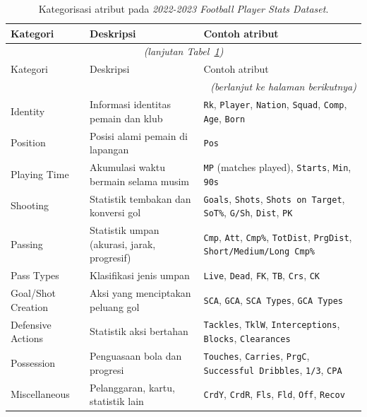 \begin{longtable}{@{}p{2.6cm} p{4.2cm} p{5.7cm}@{}}
  \caption{Kategorisasi atribut pada \emph{2022-2023 Football Player Stats Dataset}.}
  \label{tab:fbref-attr-categories} \\
  \toprule
  Kategori & Deskripsi & Contoh atribut \\
  \midrule
  \endfirsthead
  \multicolumn{3}{c}{\textit{(lanjutan Tabel~\ref{tab:fbref-attr-categories})}} \\
  \toprule
  Kategori & Deskripsi & Contoh atribut \\
  \midrule
  \endhead
  \midrule
  \multicolumn{3}{r}{\textit{(berlanjut ke halaman berikutnya)}} \\
  \endfoot
  \bottomrule
  \endlastfoot
  Identity              & Informasi identitas pemain dan klub                                & \texttt{Rk}, \texttt{Player}, \texttt{Nation}, \texttt{Squad}, \texttt{Comp}, \texttt{Age}, \texttt{Born} \\
  Position              & Posisi alami pemain di lapangan                                    & \texttt{Pos} \\
  Playing Time          & Akumulasi waktu bermain selama musim                               & \texttt{MP} (matches played), \texttt{Starts}, \texttt{Min}, \texttt{90s} \\
  Shooting              & Statistik tembakan dan konversi gol                                & \texttt{Goals}, \texttt{Shots}, \texttt{Shots on Target}, \texttt{SoT\%}, \texttt{G/Sh}, \texttt{Dist}, \texttt{PK} \\
  Passing               & Statistik umpan (akurasi, jarak, progresif)                        & \texttt{Cmp}, \texttt{Att}, \texttt{Cmp\%}, \texttt{TotDist}, \texttt{PrgDist}, \texttt{Short/Medium/Long Cmp\%} \\
  Pass Types            & Klasifikasi jenis umpan                                            & \texttt{Live}, \texttt{Dead}, \texttt{FK}, \texttt{TB}, \texttt{Crs}, \texttt{CK} \\
  Goal/Shot Creation    & Aksi yang menciptakan peluang gol                                  & \texttt{SCA}, \texttt{GCA}, \texttt{SCA Types}, \texttt{GCA Types} \\
  Defensive Actions     & Statistik aksi bertahan                                            & \texttt{Tackles}, \texttt{TklW}, \texttt{Interceptions}, \texttt{Blocks}, \texttt{Clearances} \\
  Possession            & Penguasaan bola dan progresi                                       & \texttt{Touches}, \texttt{Carries}, \texttt{PrgC}, \texttt{Successful Dribbles}, \texttt{1/3}, \texttt{CPA} \\
  Miscellaneous         & Pelanggaran, kartu, statistik lain                                 & \texttt{CrdY}, \texttt{CrdR}, \texttt{Fls}, \texttt{Fld}, \texttt{Off}, \texttt{Recov} \\
\end{longtable}

